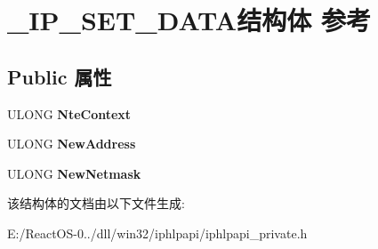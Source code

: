 \hypertarget{struct___i_p___s_e_t___d_a_t_a}{}\section{\+\_\+\+I\+P\+\_\+\+S\+E\+T\+\_\+\+D\+A\+T\+A结构体 参考}
\label{struct___i_p___s_e_t___d_a_t_a}
\subsection*{Public 属性}
\begin{DoxyCompactItemize}
\item 
\mbox{\label{struct___i_p___s_e_t___d_a_t_a_a1bea575d871d9a2edeeec3bfabed67a5}} 
U\+L\+O\+NG {\bfseries Nte\+Context}
\item 
\mbox{\label{struct___i_p___s_e_t___d_a_t_a_a21e2001f9111e98a9df8c645b533d17f}} 
U\+L\+O\+NG {\bfseries New\+Address}
\item 
\mbox{\label{struct___i_p___s_e_t___d_a_t_a_a340a9402b0783cebe47c71589c987d99}} 
U\+L\+O\+NG {\bfseries New\+Netmask}
\end{DoxyCompactItemize}


该结构体的文档由以下文件生成\+:\begin{DoxyCompactItemize}
\item 
E\+:/\+React\+O\+S-\/0../dll/win32/iphlpapi/iphlpapi\+\_\+private.\+h\end{DoxyCompactItemize}
